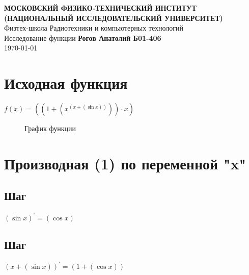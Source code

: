 \documentclass[12pt, letterpaper]{article}
\begin{document}
\begin{titlepage}
\begin{center}
\vspace*{1cm}
\textbf{МОСКОВСКИЙ ФИЗИКО-ТЕХНИЧЕСКИЙ ИНСТИТУТ (НАЦИОНАЛЬНЫЙ ИССЛЕДОВАТЕЛЬСКИЙ УНИВЕРСИТЕТ)}\\
\vspace{0.5cm} Физтех-школа Радиотехники и компьютерных технологий\\
\vspace{5cm} \LARGE{Исследование функции}
\vfill
\large{\textbf{Рогов Анатолий Б01-406}} \\
\large \today
\vspace{0.8cm}
\end{center}
\end{titlepage}
\section{Исходная функция}
\hfil $f(x) = ({({1}+{({x}^{({x}+{(\sin{x})})})})}\cdot{x})$\\
\begin{figure}[h]
\centering
{}
\caption{График функции}
\end{figure}
\section{Производная (1) по переменной "x"}
\renewcommand{\thesubsection}{\arabic{subsection}}
\titleformat{\subsection}{\normalfont\bfseries}{}{0em}{#1\ \thesubsection}
\subsection{Шаг}
\hfil $(\sin{x})^{\prime} = (\cos{x})$

\subsection{Шаг}
\hfil $({x}+{(\sin{x})})^{\prime} = ({1}+{(\cos{x})})$
\end{document}
